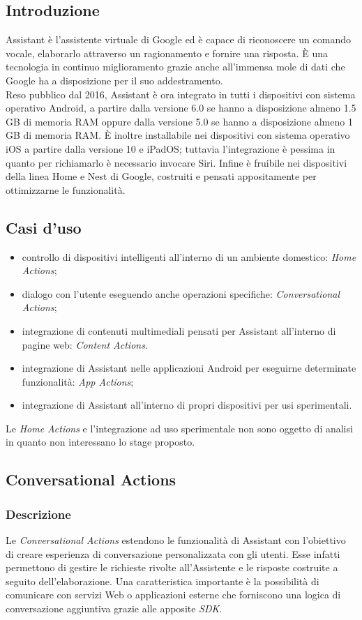 	\subsection{Introduzione}
	Assistant è l'assistente virtuale di Google ed è capace di riconoscere un comando vocale, elaborarlo attraverso un ragionamento e fornire una risposta. È una tecnologia in continuo miglioramento grazie anche all'immensa mole di dati che Google ha a disposizione per il suo addestramento. \\
	Reso pubblico dal 2016, Assistant è ora integrato in tutti i dispositivi con sistema operativo Android, a partire dalla versione 6.0 se hanno a disposizione almeno 1.5 GB di memoria RAM oppure dalla versione 5.0 se hanno a disposizione almeno 1 GB di memoria RAM. È inoltre installabile nei dispositivi con sistema operativo iOS a partire dalla versione 10 e iPadOS; tuttavia l'integrazione è pessima in quanto per richiamarlo è necessario invocare Siri. Infine è fruibile nei dispositivi della linea Home e Nest di Google, costruiti e pensati appositamente per ottimizzarne le funzionalità.
	\subsection{Casi d'uso}
	\begin{itemize}
		\item controllo di dispositivi intelligenti all'interno di un ambiente domestico: \textit{Home Actions};
		\item dialogo con l'utente eseguendo anche operazioni specifiche: \textit{Conversational Actions};
		\item integrazione di contenuti multimediali pensati per Assistant all'interno di pagine web: \textit{Content Actions}.
		\item integrazione di Assistant nelle applicazioni Android per eseguirne determinate funzionalità: \textit{App Actions};
		\item integrazione di Assistant all'interno di propri dispositivi per usi sperimentali.
	\end{itemize}
	Le \textit{Home Actions} e l'integrazione ad uso sperimentale non sono oggetto di analisi in quanto non interessano lo stage proposto.
	\subsection{Conversational Actions}
		\subsubsection{Descrizione}
		Le \textit{Conversational Actions} estendono le funzionalità di Assistant con l'obiettivo di creare esperienza di conversazione personalizzata con gli utenti. Esse infatti permettono di gestire le richieste rivolte all'Assistente e le risposte costruite a seguito dell'elaborazione. Una caratteristica importante è la possibilità di comunicare con servizi Web o applicazioni esterne che forniscono una logica di conversazione aggiuntiva grazie alle apposite \textit{SDK}.

